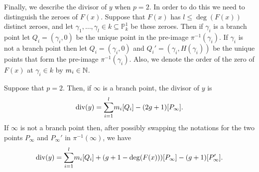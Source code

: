 Finally, we describe the divisor of $y$ when $p=2$.
In order to do this we need to distinguish the zeroes of $F(x)$.
Suppose that $F(x)$ has $l \leq \deg(F(x))$ distinct zeroes, and let $\gamma_1, \ldots, \gamma_l \in k \subseteq \mathbb P_k^1$ be these zeroes.
Then if $\gamma_i$ is a branch point let $Q_i = (\gamma_i, 0)$ be the unique point in the pre-image $\pi^{-1}(\gamma_i)$.
If $\gamma_i$ is not a branch point then let $Q_i = (\gamma_i, 0)$ and $Q_i' = (\gamma_i, H(\gamma_i))$ be the unique points that form the pre-image $\pi^{-1}(\gamma_i)$.
Also, we denote the order of the zero of $F(x)$ at $\gamma_i \in k$ by $m_i \in {\mathbb N}$.


    \begin{prop}\label{propdivisorofypis2}
    Suppose that $p=2$.
    Then, if $\infty$ is a branch point, the divisor of $y$ is
        \begin{equation*}
        \operatorname{div}(y) = 
         {\displaystyle \sum_{i=1}^l} m_i[Q_i] -(2g+1)[P_\infty].
        \end{equation*}
    If $\infty$ is not a branch point then, after possibly swapping the notations for the two points $P_\infty$ and $P_\infty'$ in $\pi^{-1}(\infty)$, we have
        \begin{equation*}
        \operatorname{div}(y) = {\displaystyle \sum_{i=1}^l} m_i[Q_i] +(g+1-\deg(F(x)))[P_\infty] - (g+1)[P_\infty'].
        \end{equation*}
    \end{prop}
